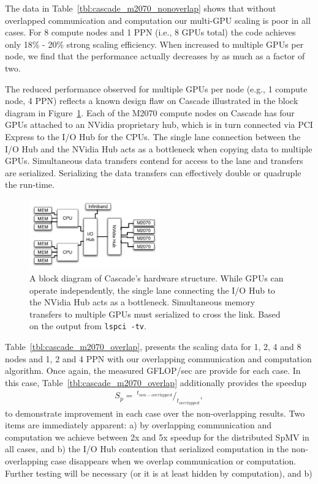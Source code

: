 The data in Table~\ref{tbl:cascade_m2070_nonoverlap} shows that without overlapped communication and computation our multi-GPU scaling is poor in all cases. For 8 compute nodes and 1 PPN (i.e., 8 GPUs total) the code achieves only 18\% - 20\% strong scaling efficiency. When increased to multiple GPUs per node, we find that the performance actually decreases by as much as a factor of two. 

The reduced performance observed for multiple GPUs per node (e.g., 1 compute node, 4 PPN) reflects a known design flaw on Cascade illustrated in the block diagram in Figure~\ref{fig:cascade_iohub}. Each of the M2070 compute nodes on Cascade has four GPUs attached to an NVidia proprietary hub, which is in turn connected via PCI Express to the I/O Hub for the CPUs. The single lane connection between the I/O Hub and the NVidia Hub acts as a bottleneck when copying data to multiple GPUs. Simultaneous data transfers contend for access to the lane and transfers are serialized. Serializing the data transfers can effectively double or quadruple the run-time. 

\begin{figure}
\centering
\includegraphics[width=0.5\textwidth]{gpu_content/omnigraffle/CascadeIOHub.pdf}
\caption{A block diagram of Cascade's hardware structure. While GPUs can operate independently, the single lane connecting the I/O Hub to the NVidia Hub acts as a bottleneck. Simultaneous memory transfers to multiple GPUs must serialized to cross the link. Based on the output from \texttt{lspci -tv}. }
\label{fig:cascade_iohub}
\end{figure}

Table~\ref{tbl:cascade_m2070_overlap}, presents the scaling data for 1, 2, 4 and 8 nodes and 1, 2 and 4 PPN with our overlapping communication and computation algorithm. Once again, the measured GFLOP/sec are provide for each case. In this case, Table~\ref{tbl:cascade_m2070_overlap} additionally provides the speedup
\begin{align*} 
S_p = \ ^{t_{non-overlapped}} /_{t_{overlapped}},
\end{align*}
to demonstrate improvement in each case over the non-overlapping results. Two items are immediately apparent: a) by overlapping communication and computation we achieve between 2x and 5x speedup for the distributed SpMV in all cases, and b) the I/O Hub contention that serialized computation in the non-overlapping case disappears when we overlap communication or computation. Further testing will be necessary  (or it is at least hidden by computation), and b) 


